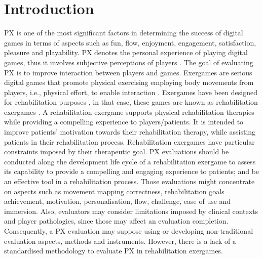 \chapter{Introduction} %
\label{ch:intro}

\ac{PX} is one of the most significant factors in determining the success of digital games in terms of aspects such as fun, flow, enjoyment, engagement, satisfaction, pleasure and playability. \ac{PX} denotes the personal experience of playing digital games, thus it involves subjective perceptions of players \autocite{Wiemeyer2016,Chu2011}. The goal of evaluating \ac{PX} is to improve interaction between players and games. 
Exergames are serious digital games that promote physical exercising \autocite{PirovanoAdvisor2012} employing body movements from players, i.e., physical effort, to enable interaction \autocite{Mueller2015}. Exergames have been designed for rehabilitation purposes \autocite{Brokaw2015,Hernandez2013,Lewis2012,Burke2009}, in that case, these games are known as rehabilitation exergames \autocite{Mader2012}. A rehabilitation exergame supports physical rehabilitation therapies while providing a compelling experience to players/patients. It is intended to improve patients’ motivation towards their rehabilitation therapy, while assisting patients in their rehabilitation process.
Rehabilitation exergames have particular constraints imposed by their therapeutic goal.
\ac{PX} evaluations should be conducted along the development life cycle of a rehabilitation exergame to assess its capability to provide a compelling and engaging experience to patients; and be an effective tool in a rehabilitation process. Those evaluations might concentrate on aspects such as movement mapping correctness, rehabilitation goals achievement, motivation, personalisation, flow, challenge, ease of use and immersion. Also, evaluators may consider limitations imposed by clinical contexts and player pathologies, since those may affect an evaluation completion. Consequently, a \ac{PX} evaluation may suppose using or developing non-traditional evaluation aspects, methods and instruments. However, there is a lack of a standardised methodology to evaluate \ac{PX} in rehabilitation exergames.

